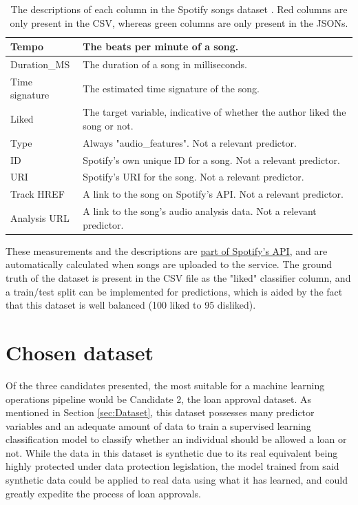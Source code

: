 \documentclass[12pt]{report}
\begin{document}
\begin{table}[H]
\begin{tabular}{ |p{} | p{}|}
            Tempo & The beats per minute of a song.\\
            \hline
            Duration\_MS & The duration of a song in milliseconds.\\
            \hline
            Time signature & The estimated time signature of the song.\\
            \hline
            \cellcolor{red!15}Liked & The target variable, indicative of whether the author liked the song or not.\\
            \hline
            \cellcolor{green!15}Type & Always "audio\_features". Not a relevant predictor.\\
            \hline
            \cellcolor{green!15}ID & Spotify's own unique ID for a song. Not a relevant predictor.\\
            \hline
            \cellcolor{green!15}URI & Spotify's URI for the song. Not a relevant predictor.\\
            \hline
            \cellcolor{green!15}Track HREF & A link to the song on Spotify's API. Not a relevant predictor.\\  
            \hline
            \cellcolor{green!15}Analysis URL & A link to the song's audio analysis data. Not a relevant predictor. \\
            \hline
    \end{tabular}
    \caption{The descriptions of each column in the Spotify songs dataset \autocite{spotify_web_nodate}. Red columns are only present in the CSV, whereas green columns are only present in the JSONs.}\label{tab:Spotify-Types}
\end{table}

These measurements and the descriptions are \href{https://developer.spotify.com/documentation/web-api/reference/get-audio-features}{part of Spotify's API},
and are automatically calculated when songs are uploaded to the service. The ground truth of the dataset is present in the CSV file as the "liked" classifier 
column, and a train/test split can be implemented for predictions, which is aided by the fact that this dataset is well balanced (100 liked to 95 disliked).

\section{Chosen dataset}
Of the three candidates presented, the most suitable for a machine learning operations pipeline would be Candidate 2, the loan approval dataset. As mentioned 
in Section \ref{sec:Dataset}, this dataset possesses many predictor variables and an adequate amount of data to train a supervised learning classification model 
to classify whether an individual should be allowed a loan or not. While the data in this dataset is synthetic due to its real equivalent being highly protected 
under data protection legislation, the model trained from said synthetic data could be applied to real data using what it has learned, and could greatly expedite 
the process of loan approvals.
\end{document}
